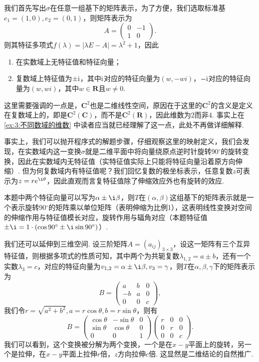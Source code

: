 \begin{solution}
    我们首先写出$\sigma$在任意一组基下的矩阵表示，为了方便，我们选取标准基$e_1=(1,0),e_2=(0,1)$，则矩阵表示为
    \[ A=\begin{pmatrix}
            0 & -1 \\ 1 & 0
        \end{pmatrix}. \]
    则其特征多项式$f(\lambda)=|\lambda E-A|=\lambda^2+1$，因此
    \begin{enumerate}
        \item 在实数域上无特征值和特征向量；

        \item 复数域上特征值为$\pm\textup{i}$，其中$\textup{i}$对应的特征向量为$(w,-wi)$，$-\textup{i}$对应的特征向量为$(w,wi)$，其中$w\in\mathbf{R}$且$w\neq 0$.
    \end{enumerate}
\end{solution}

这里需要强调的一点是，$\mathbf{C}^2$也是二维线性空间，原因在于这里的$\mathbf{C}^2$的含义是定义在复数域上的，即是$\mathbf{C}^2(\mathbf{C})$，而不是$\mathbf{C}^2(\mathbf{R})$，因此维数为2而非4. 事实上在\autoref{ex:3:不同数域的维数} 中读者应当就已经理解了这一点，此处不再做详细解释.

事实上，我们可以抛开程序式的解题步骤，仔细观察这里的映射定义，我们会发现，在实数域内这一变换$\sigma$就是二维平面中将向量绕原点逆时针旋转90$^\circ$的旋转变换，因此在实数域内无特征值（实特征值实际上只能将特征向量沿着原方向伸缩）. 但为何复数域内有特征值呢？我们回忆复数的极坐标表示，任意复数$z$可表示为$z=re^{\i\theta}$，因此直观而言复特征值除了伸缩效应外也有旋转的效应.

本题中两个特征向量可以写为$\alpha\pm \i\beta$，则$T$在$(\alpha,\beta)$这组基下的矩阵表示就是一个表示旋转90$^\circ$的矩阵乘以单位矩阵（表明伸缩为比例1），这表明线性变换对空间的伸缩作用与特征值模长对应，旋转作用与辐角对应（本题特征值$\pm \i=1\cdot(\cos 90^\circ\pm \i\sin 90^\circ)$）.

我们还可以延伸到三维空间. 设三阶矩阵$A=(a_{ij})_{3\times 3}$，设这一矩阵有三个互异特征值，则根据多项式的性质可知，其中两个为共轭复数$\lambda_{1,2}=a\pm b$，还有一个实数$\lambda_3=c$，对应的特征向量为$v_{1,2}=\alpha\pm \i\beta,v_3=\gamma$，则$T$在$\alpha,\beta,\gamma$下的矩阵表示为
\[ B=\begin{pmatrix}
        a & b & 0 \\ -b & a & 0 \\ 0 & 0 & c
    \end{pmatrix}, \]
我们令$r=\sqrt{a^2+b^2},a=r\cos\theta,b=r\sin\theta$，则有
\[ B=\begin{pmatrix}
        \cos\theta & -\sin\theta & 0 \\ \sin\theta & \cos\theta & 0 \\ 0 & 0 & 1
    \end{pmatrix}\begin{pmatrix}
        r & 0 & 0 \\ 0 & r & 0 \\ 0 & 0 & c
    \end{pmatrix}. \]
我们可以看到，这个变换被分解为两个变换，一个是在$x-y$平面上的旋转，另一个是拉伸，在$x-y$平面上拉伸$r$倍，$z$方向拉伸$c$倍. 这显然是二维结论的自然推广.

